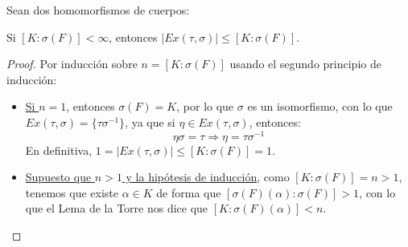 \begin{prop}\label{prop:extension_2}
    Sean dos homomorfismos de cuerpos:
    \begin{figure}[H]
        \centering
    \end{figure}
    Si $[K:\sigma(F)]<\infty$, entonces $|Ex(\tau,\sigma)| \leq [K:\sigma(F)]$.
    \begin{proof}
        Por inducción sobre $n = [K:\sigma(F)]$ usando el segundo principio de inducción:
        \begin{itemize}
            \item \underline{Si $n=1$}, entonces $\sigma(F) = K$, por lo que $\sigma$ es un isomorfismo, con lo que $Ex(\tau,\sigma) = \{\tau \sigma^{-1}\}$, ya que si $\eta \in Ex(\tau, \sigma)$, entonces:
                \begin{equation*}
                    \eta\sigma = \tau \Longrightarrow \eta = \tau\sigma^{-1}
                \end{equation*}
                En definitiva, $1 = |Ex(\tau,\sigma)| \leq [K:\sigma(F)] = 1$.
            \item \underline{Supuesto que $n>1$ y la hipótesis de inducción}, como $[K:\sigma(F)] = n > 1$, tenemos que existe $\alpha\in K$ de forma que $[\sigma(F)(\alpha):\sigma(F)] > 1$, con lo que el Lema de la Torre nos dice que $[K:\sigma(F)(\alpha)] < n$. 


\end{itemize}
\end{proof}
\end{prop}
